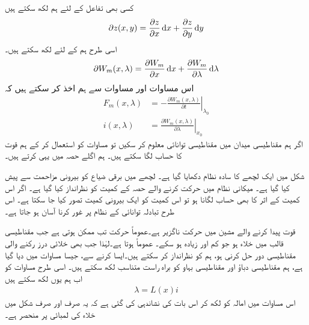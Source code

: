 	کسی بھی تفاعل  کے لئے ہم لکھ سکتے ہیں
\begin{align}\label{مساوات_تبادلہ_جزوی_تفرق_عمومی_الف}
\partial z(x,y)=\frac{\partial z}{\partial x} \dif x+\frac{\partial z}{\partial y} \dif y
\end{align}
اسی طرح ہم  کے لئے لکھ سکتے ہیں۔
\begin{align}\label{مساوات_تبادلہ_جزوی_تفرق_عمومی_ب}
\partial W_m(x,\lambda)=\frac{\partial W_m}{\partial x}\dif x+\frac{\partial W_m}{\partial \lambda}\dif \lambda
\end{align}
اس مساوات اور مساوات  سے ہم اخذ کر سکتے ہیں کہ
\begin{align}
F_m(x,\lambda)&=-\left. \frac{\partial W_m(x,\lambda)}{\partial t}\right|_{\lambda_0}\label{مساوات_تبادلہ_توانائی_قوت_برقی_رو}\\
i(x,\lambda)&=\left. \frac{\partial W_m(x,\lambda)}{\partial \lambda}\right|_{x_0}\label{مساوات_تبادلہ_توانائی_سے_رو}
\end{align}
اگر ہم مقناطیسی میدان میں مقناطیسی توانائی  معلوم کر سکیں تو مساوات   کو استعمال کر کے ہم قوت کا حساب لگا سکتے ہیں۔ ہم اگلے حصہ میں یہی کرتے ہیں۔

شکل   میں  ایک لچھے کا سادہ نظام دکھایا گیا ہے۔ لچھے میں برقی ضیاع کو بیرونی مزاحمت سے پیش کیا گیا ہے۔ میکانی نظام میں حرکت کرنے والے حصہ کے کمیت کو نظرانداز کیا گیا ہے۔ اگر اس کمیت  کے اثر کا بھی حساب لگانا ہو تو اس کمیت کو ایک بیرونی کمیت تصور کیا جا سکتا ہے۔ اس طرح تبادلہ توانائی کے نظام پر غور کرنا آسان ہو جاتا ہے۔ 

قوت پیدا کرنے والے مشین میں حرکت ناگزیر ہے۔عموماً حرکت تب ممکن ہوتی ہے جب مقناطیسی قالب میں خلاء ہو جو کم اور زیادہ ہو سکے۔  عموماً  ہوتا ہے۔لہٰذا جب بھی خلائی درز رکنے والی  مقناطیسی دور حل کرنی ہو،  ہم  کو نظرانداز کر سکتے ہیں۔ایسا کرنے سے، جیسا مساوات   میں دیا گیا ہے، ہم  مقناطیسی دباؤ  اور مقناطیسی بہاو  کو براہ راست متناسب لکھ سکتے ہیں۔ اسی طرح مساوات    کو اب  ہم  یوں لکھ سکتے ہیں
\begin{align}\label{مساوات_تبادلہ_ارتباط_بہاو_اور_امالہ}
\lambda=L(x) i
\end{align}
اس مساوات میں امالہ  کو  لکھ کر اس بات کی نشاندہی کی گئی ہے کہ یہ صرف اور صرف  شکل    میں خلاء کی لمبائی  پر منحصر ہے۔

